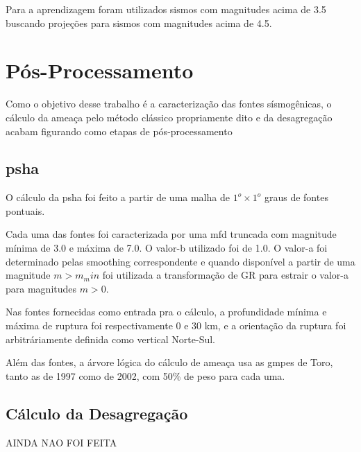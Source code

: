 Para a aprendizagem foram utilizados sismos com magnitudes acima de 3.5 buscando projeções para
sismos com magnitudes acima de 4.5.



\section{Pós-Processamento}
\label{sec:pos_proc}

Como o objetivo desse trabalho é a caracterização das fontes sísmogênicas,
o cálculo da ameaça pelo método clássico propriamente dito e da desagregação
acabam figurando como etapas de pós-processamento


\subsection{\glsdesc{psha}}
\label{sec:hazard_calc}

O cálculo da \gls{psha} foi feito a partir de uma malha 
de $1^o \times 1^o$ graus de fontes pontuais.

Cada uma das fontes foi caracterizada por uma \gls{mfd} truncada com
magnitude mínima de 3.0 e máxima de 7.0. O valor-b utilizado foi de 1.0.
O valor-a foi determinado pelas \gls{smoothing} correspondente e quando 
disponível a partir de uma magnitude $m > m_min$ foi utilizada a transformação de
\gls{GR} para estrair o valor-a para magnitudes $m > 0$.

Nas fontes fornecidas como entrada pra o cálculo, a profundidade mínima e máxima de ruptura
foi respectivamente 0 e 30 km, e a orientação da ruptura foi arbitráriamente definida como vertical Norte-Sul.

Além das fontes, a árvore lógica do cálculo de ameaça usa as \glspl{gmpe} de Toro, tanto as de 1997 como 
de 2002, com 50\% de peso para cada uma.

\subsection{Cálculo da Desagregação}
\label{sec:deaggregation}

AINDA NAO FOI FEITA

